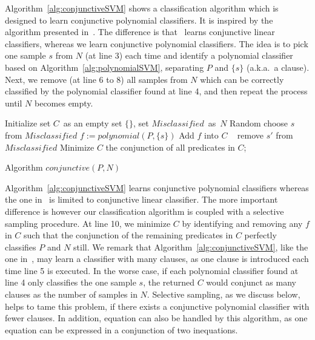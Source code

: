 Algorithm~\ref{alg:conjunctiveSVM} shows a classification algorithm which is designed to learn conjunctive polynomial classifiers.
It is inspired by the algorithm presented in~\cite{sharma2012interpolants}.
The difference is that~\cite{sharma2012interpolants} learns conjunctive linear classifiers, whereas we learn conjunctive polynomial classifiers.
The idea is to pick one sample $s$ from $N$ (at line 3) each time and identify a polynomial classifier based on Algorithm~\ref{alg:polynomialSVM},
 separating $P$ and $\{s\}$ (a.k.a.~a clause).
Next, we remove (at line 6 to 8) all samples from $N$ which can be correctly classified by the polynomial classifier found at line 4,
and then repeat the process until $N$ becomes empty.
\begin{algorithm}[t]
\SetAlgoVlined
\Indm
\Indp
    Initialize set $C$\ as an empty set $\{\}$, set $\mathit{Misclassified}$\ as\ $N$\;
     {
        Random choose $s$ from $\mathit{Misclassified}$\;
        $f := \mathit{polynomial}(P, \{s\})$\;
        Add $f$ into $C$\;
         {\
             {
                remove $s'$ from $\mathit{Misclassified}$\;
            }
        }
    }
    Minimize $C$\;
    \Return the conjunction of all predicates in $C$;
\caption{Algorithm $\mathit{conjunctive}(P, N)$}
\label{alg:conjunctiveSVM}
\end{algorithm}
Algorithm~\ref{alg:conjunctiveSVM} learns conjunctive polynomial classifiers whereas the one in~\cite{sharma2012interpolants} is limited to conjunctive linear classifier.
The more important difference is however our classification algorithm is coupled with a selective sampling procedure.
At line 10, we minimize $C$ by identifying and removing any $f$ in $C$ such that the conjunction of the remaining predicates in $C$ perfectly classifies $P$ and $N$ still.
We remark that Algorithm~\ref{alg:conjunctiveSVM}, like the one in~\cite{sharma2012interpolants},
may learn a classifier with many clauses, as one clause is introduced each time line 5 is executed.
In the worse case, if each polynomial classifier found at line 4 only classifies the one sample $s$, the returned $C$ would conjunct as many clauses as the number of samples in $N$.
Selective sampling, as we discuss below, helps to tame this problem, if there exists a conjunctive polynomial classifier with fewer clauses.
In addition, equation can also be handled by this algorithm, as one equation can be expressed in a conjunction of two inequations.
\vspace{-0.2cm}


